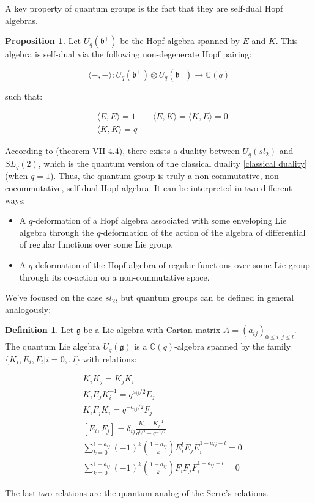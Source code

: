 \documentclass[11pt]{article}
\theoremstyle{definition}
\newtheorem{Prop}{Proposition}[section]
\newtheorem{Def}{Definition}[section]
\begin{document}
A key property of quantum groups is the fact that they are self-dual Hopf algebras.

\begin{Prop} Let \(U_q(\mathfrak{b}^+)\) be the Hopf algebra spanned by \(E\) and \(K\). This algebra is self-dual via the following non-degenerate Hopf pairing:

\[\langle-,-\rangle : U_q(\mathfrak{b}^+)\otimes U_q(\mathfrak{b}^+)\to \mathbb{C}(q)\]

such that:

\begin{align*}
&\langle E,E\rangle = 1\qquad \langle E, K\rangle =\langle K,E\rangle =0 \\
&\langle K,K\rangle = q
\end{align*}
\end{Prop}

According to \cite{Kassel} (theorem VII 4.4), there exists a duality between \(U_q(sl_2)\) and \(SL_q(2)\), which is the quantum version of the classical duality \ref{classical duality} (when \(q=1\)). Thus, the quantum group is truly a non-commutative, non-cocommutative, self-dual Hopf algebra. It can be interpreted in two different ways:

\begin{itemize}
\item A \(q\)-deformation of a Hopf algebra associated with some enveloping Lie algebra through the \(q\)-deformation of the action of the algebra of differential of regular functions over some Lie group.
\item A \(q\)-deformation of the Hopf algebra of regular functions over some Lie group through its co-action on a non-commutative space.
\end{itemize} 
\pagebreak
We've focused on the case \(sl_2\), but quantum groups can be defined in general analogously:

\begin{Def} Let \(\mathfrak{g}\) be a Lie algebra with Cartan matrix \(A=(a_{ij})_{0\leqslant i,j\leqslant l}\). The quantum Lie algebra \(U_q(\mathfrak{g})\) is a \(\mathbb{C}(q)\)-algebra spanned by the family \(\{K_i,E_i,F_i\vert i=0,..l\}\) with relations:

\begin{align*}
&K_iK_j=K_jK_i\\
&K_iE_jK_i^{-1}=q^{a_{ij}/2}E_j\\
&K_iF_jK_i=q^{-a_{ij}/2}F_j\\
&[E_i,F_j]=\delta_{ij}\frac{K_i-K_j^{-1}}{q^{1/2}-q^{-1/2}}\\
&\sum_{k=0}^{1-a_{ij}}(-1)^{k}\binom{1-a_{ij}}{k}E_i^lE_jE_i^{1-a_{ij}-l}=0\\
&\sum_{k=0}^{1-a_{ij}}(-1)^{k}\binom{1-a_{ij}}{k}F_i^lF_jF_i^{1-a_{ij}-l}=0
\end{align*}

The last two relations are the quantum analog of the Serre's relations.
\end{Def}
\end{document}
